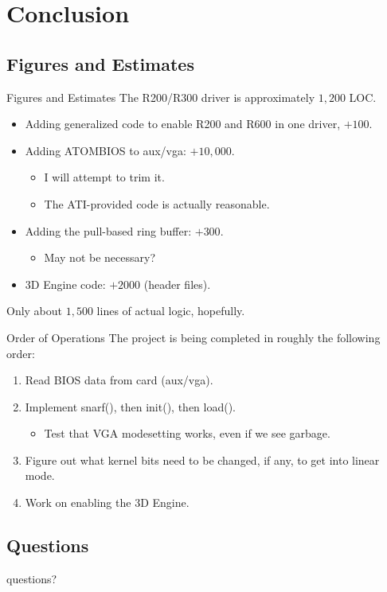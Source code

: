 \documentclass[xcolor=dvipsnames]{beamer}
\begin{document}
\section{Conclusion}

\subsection{Figures and Estimates}

\begin{frame}[t]{Figures and Estimates}
	The R200/R300 driver is approximately $1,200$ LOC. 
	\begin{itemize}
		\pause
		\item Adding generalized code to enable R200 and R600 in one driver, $+100$.

		\pause
		\item Adding ATOMBIOS to aux/vga: $+10,000$.
		\begin{itemize}
			\item I will attempt to trim it.
			\item The ATI-provided code is actually reasonable.
		\end{itemize}

		\pause
		\item Adding the pull-based ring buffer: $+300$.
		\begin{itemize}
			\item May not be necessary?
		\end{itemize}

		\pause
		\item 3D Engine code: $+2000$ (header files).
	\end{itemize}

	\pause
	Only about $1,500$ lines of actual logic, hopefully.
\end{frame}


\begin{frame}[t]{Order of Operations}
	The project is being completed in roughly the following order:
	\begin{enumerate}
		\pause
		\item Read BIOS data from card (aux/vga).

		\pause
		\item Implement snarf(), then init(), then load().
		\begin{itemize}
			\pause
			\item Test that VGA modesetting works, even if we see garbage.
		\end{itemize}

		\pause
		\item Figure out what kernel bits need to be changed, if any, to get into linear mode.

		\pause
		\item Work on enabling the 3D Engine.
	\end{enumerate}
\end{frame}


\subsection{Questions}

\begin{frame}
	\begin{center}
		questions?
	\end{center}
\end{frame}
\end{document}
